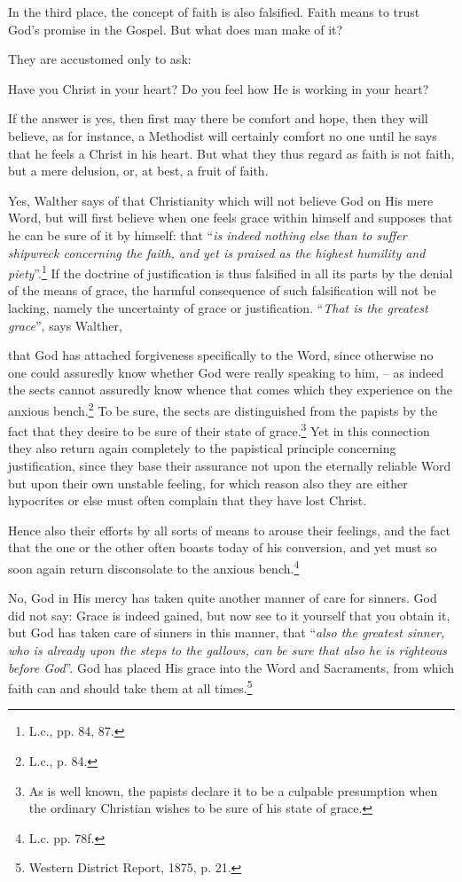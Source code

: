                 In the third place, the concept of faith is also falsified.  Faith means to trust God’s promise in the Gospel.  But what does man make of it?  \begin{fancyquotes}They are accustomed only to ask: \begin{displayquote}{\footnotesize Have you Christ in your heart? Do you feel how He is working in your heart?}\end{displayquote}  If the answer is yes, then first may there be comfort and hope, then they will believe, as for instance, a Methodist will certainly comfort no one until he says that he feels a Christ in his heart.  But what they thus regard as faith is not faith, but a mere delusion, or, at best, a fruit of faith.\end{fancyquotes} Yes, Walther says of that Christianity which will not believe God on His mere Word, but will first believe when one feels grace within himself and supposes that he can be sure of it by himself: that “\textit{is indeed nothing else than to suffer shipwreck concerning the faith, and yet is praised as the highest humility and piety}”.\footnote{L.c., pp. 84, 87.}
\divider
                If the doctrine of justification is thus falsified in all its parts by the denial of the means of grace, the harmful consequence of such falsification will not be lacking, namely the uncertainty of grace or justification.  “\textit{That is the greatest grace}”, says Walther, \begin{fancyquotes}that God has attached forgiveness specifically to the Word, since otherwise no one could assuredly know whether God were really speaking to him, -- as indeed the sects cannot assuredly know whence that comes which they experience on the anxious bench.\footnote{L.c., p. 84.} To be sure, the sects are distinguished from the papists by the fact that they desire to be sure of their state of grace.\footnote{As is well known, the papists declare it to be a culpable presumption when the ordinary Christian wishes to be sure of his state of grace.} Yet in this connection they also return again completely to the papistical principle concerning justification, since they base their assurance not upon the eternally reliable Word but upon their own unstable feeling, for which reason also they are either hypocrites or else must often complain that they have lost Christ. \par Hence also their efforts by all sorts of means to arouse their feelings, and the fact that the one or the other often boasts today of his conversion, and yet must so soon again return disconsolate to the anxious bench.\footnote{L.c. pp. 78f.}\end{fancyquotes}  No, God in His mercy has taken quite another manner of care for sinners.  God did not say: Grace is indeed gained, but now see to it yourself that you obtain it, but God has taken care of sinners in this manner, that “\textit{also the greatest sinner, who is already upon the steps to the gallows, can be sure that also he is righteous before God}”.  God has placed His grace into the Word and Sacraments, from which faith can and should take them at all times.\footnote{Western District Report, 1875, p. 21.}

